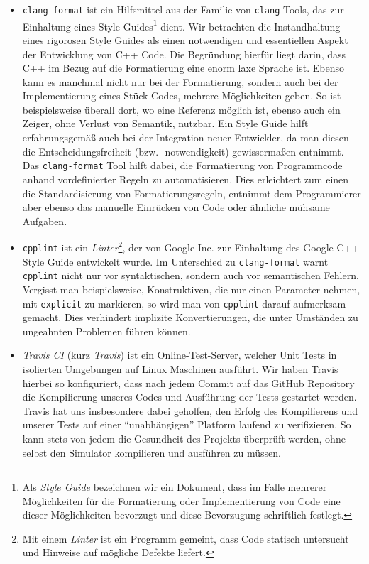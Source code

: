 \begin{itemize}

  \item \texttt{clang-format} ist ein Hilfsmittel aus der Familie von
  \texttt{clang} Tools, das zur Einhaltung eines Style Guides\footnote{Als
  \emph{Style Guide} bezeichnen wir ein Dokument, dass im Falle mehrerer
  Möglichkeiten für die Formatierung oder Implementierung von Code eine dieser
  Möglichkeiten bevorzugt und diese Bevorzugung schriftlich festlegt.} dient.
  Wir betrachten die Instandhaltung eines rigorosen Style Guides als einen
  notwendigen und essentiellen Aspekt der Entwicklung von C++ Code. Die
  Begründung hierfür liegt darin, dass C++ im Bezug auf die Formatierung eine
  enorm laxe Sprache ist. Ebenso kann es manchmal nicht nur bei der
  Formatierung, sondern auch bei der Implementierung eines Stück Codes, mehrere
  Möglichkeiten geben. So ist beispielsweise überall dort, wo eine Referenz
  möglich ist, ebenso auch ein Zeiger, ohne Verlust von Semantik, nutzbar. Ein
  Style Guide hilft erfahrungsgemäß auch bei der Integration neuer Entwickler,
  da man diesen die Entscheidungsfreiheit (bzw. -notwendigkeit) gewissermaßen
  entnimmt. Das \texttt{clang-format} Tool hilft dabei, die Formatierung von
  Programmcode anhand vordefinierter Regeln zu automatisieren. Dies erleichtert
  zum einen die Standardisierung von Formatierungsregeln, entnimmt dem
  Programmierer aber ebenso das manuelle Einrücken von Code oder ähnliche
  mühsame Aufgaben.

  \item \texttt{cpplint} ist ein \emph{Linter}\footnote{Mit einem \emph{Linter}
  ist ein Programm gemeint, dass Code statisch untersucht und Hinweise auf
  mögliche Defekte liefert.}, der von Google Inc. zur Einhaltung des Google C++
  Style Guide entwickelt wurde. Im Unterschied zu \texttt{clang-format} warnt
  \texttt{cpplint} nicht nur vor syntaktischen, sondern auch vor semantischen
  Fehlern. Vergisst man beispielsweise, Konstruktiven, die nur einen Parameter
  nehmen, mit \texttt{explicit} zu markieren, so wird man von \texttt{cpplint}
  darauf aufmerksam gemacht. Dies verhindert implizite Konvertierungen, die
  unter Umständen zu ungeahnten Problemen führen können.

  \item \emph{Travis CI} (kurz \emph{Travis}) ist ein Online-Test-Server,
  welcher Unit Tests in isolierten Umgebungen auf Linux Maschinen ausführt. Wir
  haben Travis hierbei so konfiguriert, dass nach jedem Commit auf das GitHub
  Repository die Kompilierung unseres Codes und Ausführung der Tests gestartet
  werden. Travis hat uns insbesondere dabei geholfen, den Erfolg des
  Kompilierens und unserer Tests auf einer ``unabhängigen'' Platform laufend zu
  verifizieren. So kann stets von jedem die Gesundheit des Projekts überprüft
  werden, ohne selbst den Simulator kompilieren und ausführen zu müssen.

\end{itemize}

